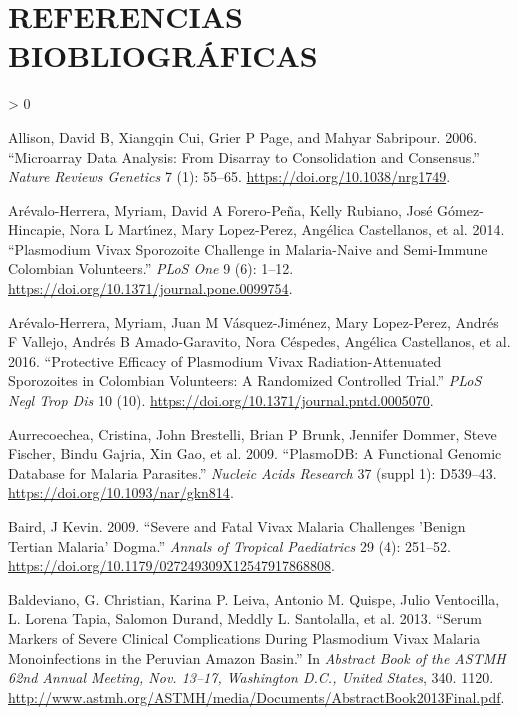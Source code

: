 \documentclass[
  a4paper]{article}
\newlength{\cslhangindent}
\newenvironment{CSLReferences}[2] %
 {%
  \setlength{\parindent}{0pt}
  \ifodd #1 \everypar{\setlength{\hangindent}{\cslhangindent}}\ignorespaces\fi
  \ifnum #2 > 0
  \setlength{\parskip}{#2\baselineskip}
  \fi
 }%
 {}
\begin{document}
\hypertarget{referencias-biobliogruxe1ficas}{%
\section{REFERENCIAS
BIOBLIOGRÁFICAS}\label{referencias-biobliogruxe1ficas}}

\hypertarget{refs}{}
\begin{CSLReferences}{1}{0}
\leavevmode\hypertarget{ref-allison2006}{}%
Allison, David B, Xiangqin Cui, Grier P Page, and Mahyar Sabripour.
2006. {``Microarray Data Analysis: From Disarray to Consolidation and
Consensus.''} \emph{Nature Reviews Genetics} 7 (1): 55--65.
\url{https://doi.org/10.1038/nrg1749}.

\leavevmode\hypertarget{ref-arevalo2014}{}%
Arévalo-Herrera, Myriam, David A Forero-Peña, Kelly Rubiano, José
Gómez-Hincapie, Nora L Martı́nez, Mary Lopez-Perez, Angélica Castellanos,
et al. 2014. {``Plasmodium Vivax Sporozoite Challenge in Malaria-Naive
and Semi-Immune Colombian Volunteers.''} \emph{PLoS One} 9 (6): 1--12.
\url{https://doi.org/10.1371/journal.pone.0099754}.

\leavevmode\hypertarget{ref-arevalo2016spz}{}%
Arévalo-Herrera, Myriam, Juan M Vásquez-Jiménez, Mary Lopez-Perez,
Andrés F Vallejo, Andrés B Amado-Garavito, Nora Céspedes, Angélica
Castellanos, et al. 2016. {``Protective Efficacy of Plasmodium Vivax
Radiation-Attenuated Sporozoites in Colombian Volunteers: A Randomized
Controlled Trial.''} \emph{PLoS Negl Trop Dis} 10 (10).
\url{https://doi.org/10.1371/journal.pntd.0005070}.

\leavevmode\hypertarget{ref-plasmodb}{}%
Aurrecoechea, Cristina, John Brestelli, Brian P Brunk, Jennifer Dommer,
Steve Fischer, Bindu Gajria, Xin Gao, et al. 2009. {``PlasmoDB: A
Functional Genomic Database for Malaria Parasites.''} \emph{Nucleic
Acids Research} 37 (suppl 1): D539--43.
\url{https://doi.org/10.1093/nar/gkn814}.

\leavevmode\hypertarget{ref-baird2009}{}%
Baird, J Kevin. 2009. {``Severe and Fatal Vivax Malaria Challenges
'Benign Tertian Malaria' Dogma.''} \emph{Annals of Tropical Paediatrics}
29 (4): 251--52. \url{https://doi.org/10.1179/027249309X12547917868808}.

\leavevmode\hypertarget{ref-baldevi2013}{}%
Baldeviano, G. Christian, Karina P. Leiva, Antonio M. Quispe, Julio
Ventocilla, L. Lorena Tapia, Salomon Durand, Meddly L. Santolalla, et
al. 2013. {``Serum Markers of Severe Clinical Complications During
Plasmodium Vivax Malaria Monoinfections in the {Peruvian Amazon}
Basin.''} In \emph{Abstract Book of the ASTMH 62nd Annual Meeting, Nov.
13--17, Washington {D.C.}, United States}, 340. 1120.
\url{http://www.astmh.org/ASTMH/media/Documents/AbstractBook2013Final.pdf}.


\end{CSLReferences}
\end{document}
